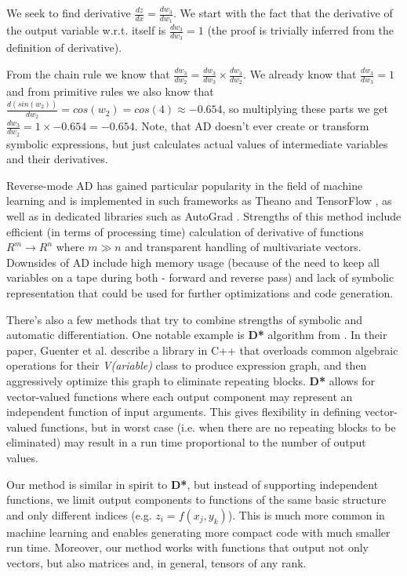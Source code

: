 \documentclass[conference]{IEEEtran}
\begin{document}
We seek to find derivative $\frac{dz}{dx} = \frac{dw_3}{dw_1}$. We
start with the fact that the derivative of the output variable
w.r.t. itself is $\frac{dw_3}{dw_3} = 1$ (the proof is trivially
inferred from the definition of derivative).


From the chain rule we know that
$\frac{dw_3}{dw_2} = \frac{dw_3}{dw_3} \times \frac{dw_3}{dw_2}$. We
already know that $\frac{dw_3}{dw_3} = 1$ and from primitive rules we
also know that
$\frac{d(sin(w_2))}{dw_2} = cos(w_2) = cos(4) \approx -0.654$, so
multiplying these parts we get
$\frac{dw_3}{dw_2} = 1 \times −0.654 = −0.654$.  Note, that AD doesn't
ever create or transform symbolic expressions, but just calculates
actual values of intermediate variables and their derivatives.

Reverse-mode AD has gained particular popularity in the field of
machine learning and is implemented in such frameworks as Theano
\cite{Theano} and TensorFlow \cite{TensorFlow}, as well as in
dedicated libraries such as AutoGrad \cite{AutoGrad}. Strengths of
this method include efficient (in terms of processing time)
calculation of derivative of functions $R^m \to R^n$ where $m \gg n$
and transparent handling of multivariate vectors. Downsides of AD
include high memory usage (because of the need to keep all variables
on a tape during both - forward and reverse pass) and lack of symbolic
representation that could be used for further optimizations and code
generation.

There's also a few methods that try to combine strengths of symbolic
and automatic differentiation. One notable example is \textbf{D*}
algorithm from \cite{guenter2007}. In their paper, Guenter et
al. describe a library in C++ that overloads common algebraic
operations for their \textit{V(ariable)} class to produce expression
graph, and then aggressively optimize this graph to eliminate
repeating blocks. \textbf{D*} allows for vector-valued functions where
each output component may represent an independent function of input
arguments. This gives flexibility in defining vector-valued functions,
but in worst case (i.e. when there are no repeating blocks to be
eliminated) may result in a run time proportional to the number of
output values.

Our method is similar in spirit to \textbf{D*}, but instead of
supporting independent functions, we limit output components to
functions of the same basic structure and only different indices
(e.g. $z_i = f(x_j, y_k)$). This is much more common in machine
learning and enables generating more compact code with much smaller
run time. Moreover, our method works with functions that output not
only vectors, but also matrices and, in general, tensors of any rank.
\end{document}
